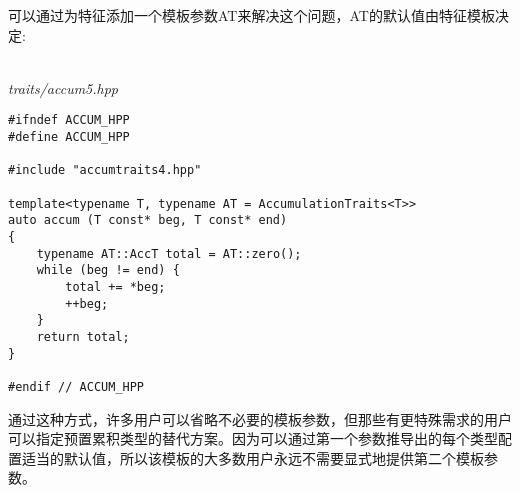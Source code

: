 可以通过为特征添加一个模板参数AT来解决这个问题，AT的默认值由特征模板决定:

\hspace*{\fill} \\ %
\noindent
\textit{traits/accum5.hpp}
\begin{lstlisting}[style=styleCXX]
#ifndef ACCUM_HPP
#define ACCUM_HPP

#include "accumtraits4.hpp"

template<typename T, typename AT = AccumulationTraits<T>>
auto accum (T const* beg, T const* end)
{
	typename AT::AccT total = AT::zero();
	while (beg != end) {
		total += *beg;
		++beg;
	}
	return total;
}

#endif // ACCUM_HPP
\end{lstlisting}

通过这种方式，许多用户可以省略不必要的模板参数，但那些有更特殊需求的用户可以指定预置累积类型的替代方案。因为可以通过第一个参数推导出的每个类型配置适当的默认值，所以该模板的大多数用户永远不需要显式地提供第二个模板参数。









